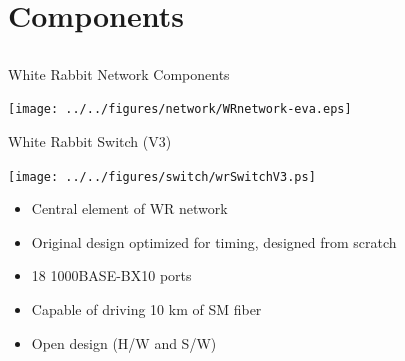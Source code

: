 \documentclass[compress,red]{beamer}
\begin{document}
\section{Components}
\subsection{}
\begin{frame}{White Rabbit Network Components}


    \begin{center}
    \texttt{[image: ../../figures/network/WRnetwork-eva.eps]}  
    \end{center}

\end{frame}
\begin{frame}{White Rabbit Switch (V3)}

    \begin{center}
    \texttt{[image: ../../figures/switch/wrSwitchV3.ps]}
    \end{center}

	\begin{itemize}
	\item Central element of WR network
	\item Original design optimized for timing, designed from scratch
	\item 18 1000BASE-BX10 ports
	\item Capable of driving 10 km of SM fiber
	\item Open design (H/W and S/W)
	\end{itemize}

\end{frame}
\end{document}
